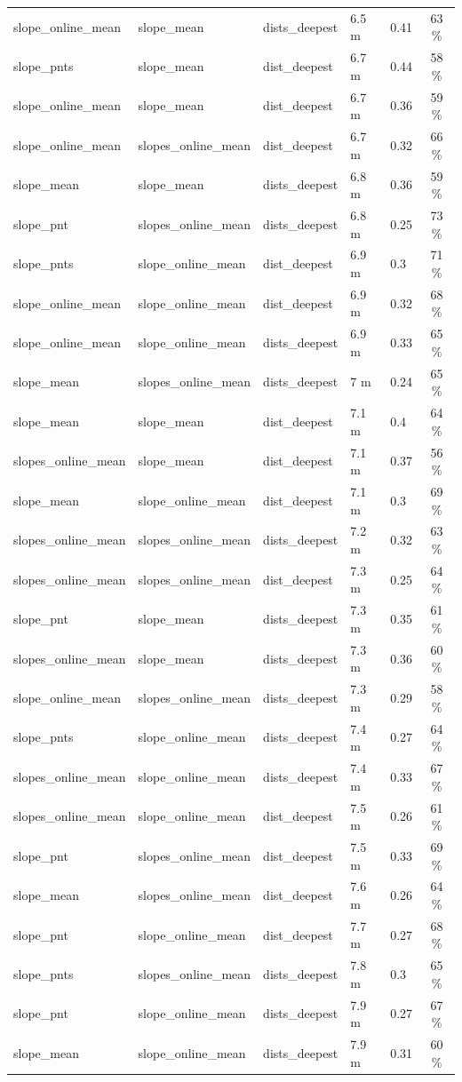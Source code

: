 \documentclass[draft,wrr]{agutexSI2019}
\begin{document}
\begin{table}
\begin{tabular}{lllllc}
slope\_online\_mean & slope\_mean & dists\_deepest & 6.5 m & 0.41 & 63 \%\\
slope\_pnts & slope\_mean & dist\_deepest & 6.7 m & 0.44 & 58 \%\\
slope\_online\_mean & slope\_mean & dist\_deepest & 6.7 m & 0.36 & 59 \%\\
slope\_online\_mean & slopes\_online\_mean & dist\_deepest & 6.7 m & 0.32 & 66 \%\\
slope\_mean & slope\_mean & dists\_deepest & 6.8 m & 0.36 & 59 \%\\
slope\_pnt & slopes\_online\_mean & dists\_deepest & 6.8 m & 0.25 & 73 \%\\
slope\_pnts & slope\_online\_mean & dist\_deepest & 6.9 m & 0.3 & 71 \%\\
slope\_online\_mean & slope\_online\_mean & dist\_deepest & 6.9 m & 0.32 & 68 \%\\
slope\_online\_mean & slope\_online\_mean & dists\_deepest & 6.9 m & 0.33 & 65 \%\\
slope\_mean & slopes\_online\_mean & dists\_deepest & 7 m & 0.24 & 65 \%\\
slope\_mean & slope\_mean & dist\_deepest & 7.1 m & 0.4 & 64 \%\\
slopes\_online\_mean & slope\_mean & dist\_deepest & 7.1 m & 0.37 & 56 \%\\
slope\_mean & slope\_online\_mean & dist\_deepest & 7.1 m & 0.3 & 69 \%\\
slopes\_online\_mean & slopes\_online\_mean & dists\_deepest & 7.2 m & 0.32 & 63 \%\\
slopes\_online\_mean & slopes\_online\_mean & dist\_deepest & 7.3 m & 0.25 & 64 \%\\
slope\_pnt & slope\_mean & dists\_deepest & 7.3 m & 0.35 & 61 \%\\
slopes\_online\_mean & slope\_mean & dists\_deepest & 7.3 m & 0.36 & 60 \%\\
slope\_online\_mean & slopes\_online\_mean & dists\_deepest & 7.3 m & 0.29 & 58 \%\\
slope\_pnts & slope\_online\_mean & dists\_deepest & 7.4 m & 0.27 & 64 \%\\
slopes\_online\_mean & slope\_online\_mean & dists\_deepest & 7.4 m & 0.33 & 67 \%\\
slopes\_online\_mean & slope\_online\_mean & dist\_deepest & 7.5 m & 0.26 & 61 \%\\
slope\_pnt & slopes\_online\_mean & dist\_deepest & 7.5 m & 0.33 & 69 \%\\
slope\_mean & slopes\_online\_mean & dist\_deepest & 7.6 m & 0.26 & 64 \%\\
slope\_pnt & slope\_online\_mean & dist\_deepest & 7.7 m & 0.27 & 68 \%\\
slope\_pnts & slopes\_online\_mean & dists\_deepest & 7.8 m & 0.3 & 65 \%\\
slope\_pnt & slope\_online\_mean & dists\_deepest & 7.9 m & 0.27 & 67 \%\\
slope\_mean & slope\_online\_mean & dists\_deepest & 7.9 m & 0.31 & 60 \%\\
\hline
\end{tabular}
\end{table}
\end{document}
